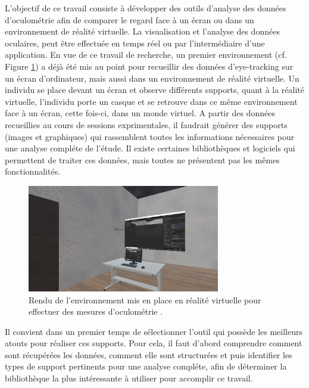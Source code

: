 \documentclass[12pt]{article}
\begin{document}
\bigskip
L'objectif de ce travail consiste à développer des outils d'analyse des données
d'oculométrie afin de comparer le regard face à un écran ou dans un
environnement de réalité virtuelle. La visualisation et l'analyse des données
oculaires, peut être effectuée en temps réel ou par l'intermédiaire d'une
application. En vue de ce travail de recherche, un premier environnement (cf.
Figure \ref{fig:environnement}) a déjà été mis au point pour recueillir des
données d'eye-tracking sur un écran d'ordinateur, mais aussi dans un
environnement de réalité virtuelle. Un individu se place devant un écran et
observe différents supports, quant à la réalité virtuelle, l'individu porte un
casque et se retrouve dans ce même environnement face à un écran, cette fois-ci,
dans un monde virtuel. A partir des données recueillies au cours de sessions
exprimentales, il faudrait générer des supports (images et graphiques)
qui rassemblent toutes les informations nécessaires pour une analyse compléte de
l'étude. Il existe certaines bibliothèques et logiciels qui permettent de
traiter ces données, mais toutes ne présentent pas les mêmes fonctionnalités.

\begin{figure}[htpb]
  \centering
  \includegraphics[width=0.75\textwidth,keepaspectratio=true]{environnement.png}
  \caption{Rendu de l'environnement mis en place en réalité virtuelle pour
    effectuer des mesures d'oculométrie \cite{img:environnement}.}
  \label{fig:environnement}
\end{figure}

\bigskip
Il convient dans un premier temps de sélectionner l'outil qui possède les
meilleurs atouts pour réaliser ces supports. Pour cela, il faut d'abord
comprendre comment sont récupérées les données, comment elle sont structurées
et puis identifier les types de support pertinents pour une analyse compléte,
afin de déterminer la bibliothèque la plus intéressante à utiliser pour
accomplir ce travail.
\end{document}
